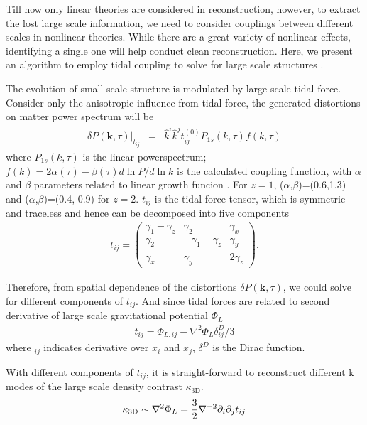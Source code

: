 
Till now only linear theories are considered in reconstruction, 
however, to extract the lost large scale information, 
we need to consider couplings between different scales in nonlinear theories. 
While there are a great variety of nonlinear effects, 
identifying a single one will help conduct clean reconstruction.   
Here, we present an algorithm to employ 
tidal coupling 
to solve for large scale structures 
\cite{2015:zhu,2012:pen}.  

The evolution of small scale structure is modulated by large scale 
tidal force. 
Consider only the anisotropic influence from tidal force, 
the generated distortions on matter power spectrum will be 
\begin{eqnarray}
\label{eq:powerdistort}
\delta P(\bm{k},\tau)|_{t_{ij}}&=&
\hat{k}^i\hat{k}^jt_{ij}^{(0)}P_{1s}(k,\tau)f(k,\tau)
\end{eqnarray}
where $P_{1s}(k,\tau)$ is the linear powerspectrum; 
$f(k)=2\alpha(\tau)-\beta(\tau)d\ln P/d\ln k$ is the calculated coupling function, 
with $\alpha$ and $\beta$ parameters related to linear growth funcion \cite{2015:zhu}. 
For $z=1$, ($\alpha$,$\beta$)=(0.6,1.3) and ($\alpha$,$\beta$)=(0.4, 0.9) for $z=2$. 
$t_{ij}$ is the tidal force tensor, 
which is symmetric and traceless 
and hence can be decomposed into five components 
\begin{eqnarray}
t_{ij}=\left( \begin{array}{ccc}
\gamma_{1}-\gamma_{z} & \gamma_{2} & \gamma_{x}\\
\gamma_{2} & -\gamma_{1}-\gamma_{z} & \gamma_{y}\\
\gamma_{x} & \gamma_{y} & 2\gamma_z
\end{array} \right).
\end{eqnarray}

Therefore, from spatial dependence of the distortions 
$\delta P(\bm{k},\tau)$, 
we could solve for different components of $t_{ij}$. 
And since tidal forces are related to second derivative 
of large scale gravitational potential $\Phi_L$ 
\begin{eqnarray}
\label{eq:tij}
t_{ij}=\Phi_{L,ij}-\nabla^2\Phi_L\delta^D_{ij}/3
\end{eqnarray}
where $_{ij}$ indicates derivative over $x_i$ and $x_j$, 
$\delta^D$ is the Dirac function.

With different components of $t_{ij}$, 
it is straight-forward to reconstruct 
different k modes of the large scale 
density contrast $\kappa_\mathrm{3D}$.
\begin{eqnarray}
    \label{eq:largepoten}
    \kappa_\mathrm{3D}\sim\nabla^2\Phi_L=\frac{3}{2}\nabla^{-2}\partial_i\partial_j t_{ij}
\end{eqnarray}

